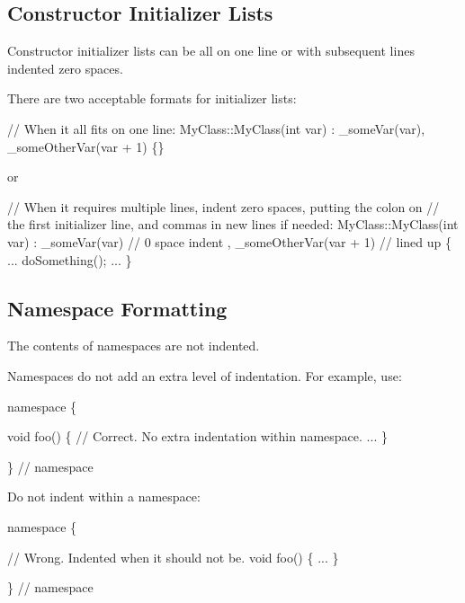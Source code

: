 \subsection*{Constructor Initializer Lists}

Constructor initializer lists can be all on one line or with subsequent lines indented zero spaces.

There are two acceptable formats for initializer lists\+:


\begin{DoxyCode}
\textcolor{comment}{// When it all fits on one line:}
MyClass::MyClass(\textcolor{keywordtype}{int} var) : \_someVar(var), \_someOtherVar(var + 1) \{\}
\end{DoxyCode}


or


\begin{DoxyCode}
\textcolor{comment}{// When it requires multiple lines, indent zero spaces, putting the colon on}
\textcolor{comment}{// the first initializer line, and commas in new lines if needed:}
MyClass::MyClass(\textcolor{keywordtype}{int} var)
: \_someVar(var)             \textcolor{comment}{// 0 space indent}
, \_someOtherVar(var + 1)    \textcolor{comment}{// lined up}
\{
    ...
    doSomething();
    ...
\}
\end{DoxyCode}


\subsection*{Namespace Formatting}

The contents of namespaces are not indented.

Namespaces do not add an extra level of indentation. For example, use\+:


\begin{DoxyCode}
\textcolor{keyword}{namespace }\{

\textcolor{keywordtype}{void} foo() \{  \textcolor{comment}{// Correct.  No extra indentation within namespace.}
  ...
\}

\}  \textcolor{comment}{// namespace}
\end{DoxyCode}


Do not indent within a namespace\+:


\begin{DoxyCode}
\textcolor{keyword}{namespace }\{

  \textcolor{comment}{// Wrong.  Indented when it should not be.}
  \textcolor{keywordtype}{void} foo() \{
    ...
  \}

\}  \textcolor{comment}{// namespace}
\end{DoxyCode}


